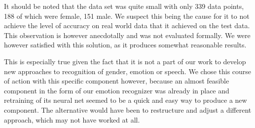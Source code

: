 It should be noted that the data set was quite small with only 339 data points, 188 of which were female, 151 male. %
We suspect this being the cause for it to not achieve the level of accuracy on real world data that it achieved on the test data.
This observation is however anecdotally and was not evaluated formally.
We were however satisfied with this solution, as it produces somewhat reasonable results.

This is especially true given the fact that it is not a part of our work to develop new approaches to recognition of gender, emotion or speech.
We chose this course of action with this specific component however, because an almost feasible component in the form of our emotion recognizer was already in place and retraining of its neural net seemed to be a quick and easy way to produce a new component.
The alternative would have been to restructure and adjust a different approach, which may not have worked at all.







